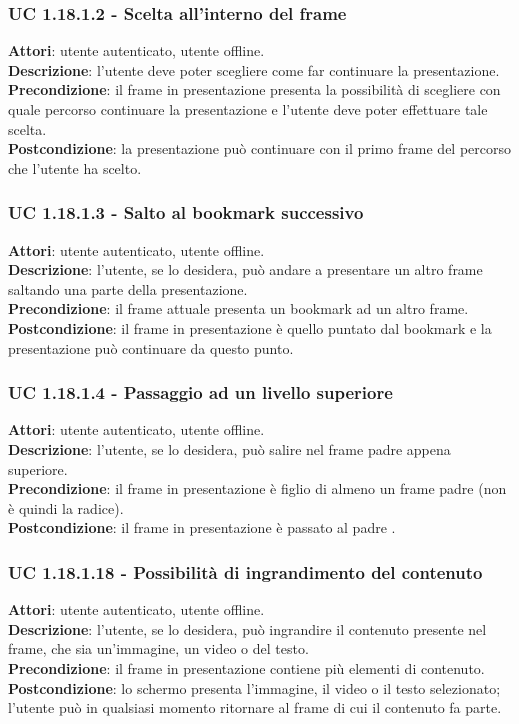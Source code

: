 	\subsubsection{UC 1.18.1.2 - Scelta all'interno del frame}{
		\label{uc1.18.1.2}
		\textbf{Attori}: utente autenticato, utente offline. \\
		\textbf{Descrizione}: l'utente deve poter scegliere come far continuare la presentazione. \\
		\textbf{Precondizione}: il frame in presentazione presenta la possibilità di scegliere con quale percorso continuare la presentazione e l'utente deve poter effettuare tale scelta.	\\
		\textbf{Postcondizione}: la presentazione può continuare con il primo frame del percorso che l'utente ha scelto.
	}
	\subsubsection{UC 1.18.1.3 - Salto al bookmark successivo}{
		\label{uc1.18.1.3}
		\textbf{Attori}: utente autenticato, utente offline. \\
		\textbf{Descrizione}: l'utente, se lo desidera, può andare a presentare un altro frame saltando una parte della presentazione. \\
		\textbf{Precondizione}: il frame attuale presenta un bookmark ad un altro frame.	\\
		\textbf{Postcondizione}: il frame in presentazione è quello puntato dal bookmark e la presentazione può continuare da questo punto.	
	}
	\subsubsection{UC 1.18.1.4 - Passaggio ad un livello superiore}{
		\label{uc1.18.1.4}
		\textbf{Attori}: utente autenticato, utente offline. \\
		\textbf{Descrizione}: l'utente, se lo desidera, può salire nel frame padre appena superiore. \\
		\textbf{Precondizione}: il frame in presentazione è figlio di almeno un frame padre (non è quindi la radice).	\\
		\textbf{Postcondizione}: il frame in presentazione è passato al padre .	
	}
	\subsubsection{UC 1.18.1.18 - Possibilità di ingrandimento del contenuto}{
		\label{uc1.18.1.18}
		\textbf{Attori}: utente autenticato, utente offline. \\
		\textbf{Descrizione}: l'utente, se lo desidera, può ingrandire il contenuto presente nel frame, che sia un'immagine, un video o del testo. \\
		\textbf{Precondizione}: il frame in presentazione contiene più elementi di contenuto.	\\
		\textbf{Postcondizione}: lo schermo presenta l'immagine, il video o il testo selezionato; l'utente può in qualsiasi momento ritornare al frame di cui il contenuto fa parte.	
	}
